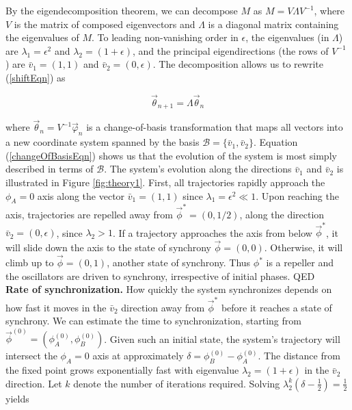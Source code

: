By the eigendecomposition theorem, we can decompose $M$ as
$M=V\Lambda V^{-1}$, where $V$ is the matrix of composed
eigenvectors and $\Lambda$ is a diagonal matrix containing the
eigenvalues of $M$. To leading non-vanishing order in $\epsilon$,
the eigenvalues (in $\Lambda$) are $\lambda_1=\epsilon^2$ and
$\lambda_2=(1+\epsilon)$, and the principal eigendirections (the
rows of $V^{-1}$) are $\bar{v}_1=(1,1)$ and
$\bar{v}_2=(0,\epsilon)$. The decomposition allows us to rewrite
(\ref{shiftEqn}) as

\begin{equation}\label{changeOfBasisEqn}
    \vec{\theta}_{n+1}=\Lambda\vec{\theta}_{n}
\end{equation}

where $\vec{\theta}_{n}=V^{-1}\vec{\varphi}_n$ is a change-of-basis
transformation that maps all vectors into a new coordinate system
spanned by the basis $\mathcal{B}=\{\bar{v}_1, \bar{v}_2\}$. Equation
(\ref{changeOfBasisEqn}) shows us that the evolution of the system is
most simply described in terms of $\mathcal{B}$. The system's
evolution along the directions $\bar{v}_1$ and $\bar{v}_2$ is
illustrated in Figure \ref{fig:theory1}. First, all trajectories
rapidly approach the $\phi_A=0$ axis along the vector
$\bar{v}_1=(1,1)$ since $\lambda_1=\epsilon^2 \ll 1$. Upon reaching
the axis, trajectories are repelled away from $\vec{\phi}^*=(0, 1/2)$,
along the direction $\bar{v}_2=(0,\epsilon)$, since $\lambda_2 >
1$. If a trajectory approaches the axis from below $\vec{\phi}^*$, it
will slide down the axis to the state of synchrony
$\vec{\phi}=(0,0)$. Otherwise, it will climb up to $\vec{\phi}=(0,1)$,
another state of synchrony. Thus $\phi^*$ is a repeller and the
oscillators are driven to synchrony, irrespective of initial
phases. QED\\

{\bf Rate of synchronization.} How quickly the system
synchronizes depends on how fast it moves in the $\bar{v}_2$ direction
away from $\vec{\phi}^*$ before it reaches a state of synchrony. We
can estimate the time to synchronization, starting from
$\vec{\phi}^{(0)}=(\phi_A^{(0)}, \phi_B^{(0)})$. Given such an initial
state, the system's trajectory will intersect the $\phi_A=0$ axis at
approximately $\delta=\phi_B^{(0)}-\phi_A^{(0)}$. The distance from
the fixed point grows exponentially fast with eigenvalue
$\lambda_2=(1+\epsilon)$ in the $\bar{v}_2$ direction. Let $k$ denote
the number of iterations required. Solving $\lambda_2^k
(\delta-\frac{1}{2}) = \frac{1}{2}$ yields

